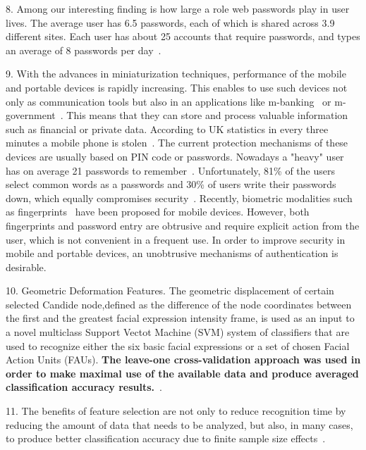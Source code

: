 8. Among our interesting finding is how large a role web passwords play in user lives. The average user has 6.5 passwords, each of which is shared across 3.9 different sites. Each user has about 25 accounts that require passwords, and types an average of 8 passwords per day~\cite{florencio2007}.

9. With the advances in miniaturization techniques, performance of the mobile and portable devices is rapidly increasing. This enables to use such devices not only as communication tools but also in an applications like m-banking~\cite{Pousttchi2004Assessment} or m-government~\cite{Kim1970Architecture}. This means that they can store and process valuable information such as financial or private data. According to UK statistics in every three minutes a mobile phone is stolen~\cite{hugeSurge2006}. The current protection mechanisms of these devices are usually based on PIN code or passwords. Nowadays a "heavy" user has on average 21 passwords to remember~\cite{2002NATMonitor}. Unfortunately, 81\% of the users select common words as a passwords and 30\% of users write their passwords down, which equally compromises security~\cite{2002NATMonitor}. Recently, biometric modalities such as fingerprints~\cite{Su2005A,Chen2005A} have been proposed for mobile devices. However, both fingerprints and password entry are obtrusive and require explicit action from the user, which is not convenient in a frequent use. In order to improve security in mobile and portable devices, an unobtrusive mechanisms of authentication is desirable.

10. Geometric Deformation Features. The geometric displacement of certain selected Candide node,defined as the difference of the node coordinates between the first and the greatest facial expression intensity frame, is used as an input to a novel multiclass Support Vectot Machine (SVM) system of classifiers that are used to recognize either the six basic facial expressions or a set of chosen Facial Action Units (FAUs).
\textbf{The leave-one cross-validation approach was used in order to make maximal use of the available data and produce averaged classification accuracy results.}~\cite{Kotsia2007Facial}.

11. The benefits of feature selection are not only to reduce recognition time by reducing the amount of data that needs to be analyzed, but also, in many cases, to produce better classification accuracy due to finite sample size effects~\cite{Jain1997Feature}.
